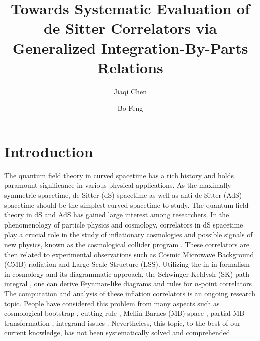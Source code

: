 \documentclass[a4paper,11pt]{article}
\title{
Towards Systematic Evaluation of de Sitter Correlators via  Generalized Integration-By-Parts
Relations
}
\author[a]{Jiaqi Chen}
\author[a,b]{Bo Feng}
\affiliation[a]{Beijing Computational Science Research Center, Beijing 100084, China}
\affiliation[b]{Peng Huanwu Center for Fundamental Theory, Hefei, Anhui 230026, China}
\begin{document}
\maketitle


\section{Introduction}

The  quantum field theory in curved spacetime has a rich history and holds paramount significance in various physical applications. As the maximally symmetric spacetime, de Sitter (dS) spacetime as well as anti-de Sitter (AdS) spacetime should be the simplest  curved spacetime to study. The quantum field theory in dS and AdS  has gained large interest among researchers. In the phenomenology of particle physics and cosmology, correlators in dS spacetime play a crucial role in the study of inflationary cosmologies and possible signals of new physics, known as the cosmological
collider program \cite{Chen:2009we,Chen:2009zp,Arkani-Hamed:2015bza}. These correlators are then related to experimental observations \cite{Achucarro:2022qrl} such as Cosmic Microwave Background (CMB) radiation and Large-Scale Structure (LSS). Utilizing the in-in formalism \cite{schwinger1961brownian} in cosmology  \cite{Calzetta:1986ey,Weinberg:2005vy} and its diagrammatic approach, the Schwinger-Keldysh (SK) path integral \cite{schwinger1961brownian,keldysh1965diagram,feynman1963theory}, one can derive Feynman-like diagrams and rules for  $n$-point correlators \cite{Chen:2017ryl}. The computation and analysis of these inflation correlators is an ongoing research topic. People have considered this problem from many aspects such as cosmological bootstrap \cite{Arkani-Hamed:2018kmz,Baumann:2019oyu,Baumann:2020dch,Pajer:2020wnj,Hillman:2021bnk,Baumann:2021fxj,Hogervorst:2021uvp,Pimentel:2022fsc,Jazayeri:2022kjy,Wang:2022eop,Baumann:2022jpr}, cutting rule \cite{Goodhew:2020hob,Goodhew:2021oqg,Melville:2021lst,DiPietro:2021sjt,Tong:2021wai,Salcedo:2022aal,Agui-Salcedo:2023wlq}, Mellin-Barnes (MB) space \cite{
Sleight:2019hfp,Sleight:2019mgd,Sleight:2020obc,Sleight:2021plv,Jazayeri:2021fvk,Premkumar:2021mlz}, partial MB transformation \cite{Qin:2022lva,Qin:2022fbv,Qin:2023ejc,Qin:2023bjk}, integrand issues \cite{Xianyu:2022jwk,Loparco:2023rug, Arkani-Hamed:2017fdk,Arkani-Hamed:2018bjr,Lee:2022fgr,Gomez:2021qfd,Gomez:2021ujt}. Nevertheless, this topic, to the best of our current knowledge, has not been systematically solved and comprehended.
\end{document}
